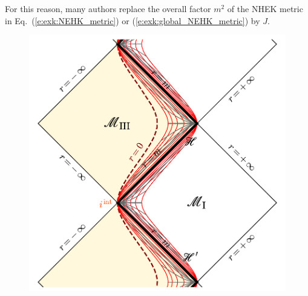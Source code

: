 \begin{remark}
For this reason, many authors replace the overall factor $m^2$ of the NHEK metric
in Eq.~(\ref{e:exk:NEHK_metric}) or (\ref{e:exk:global_NEHK_metric}) by $J$.
\end{remark}


\begin{figure}
\begin{minipage}[c]{0.6\textwidth}
\includegraphics[width=\textwidth]{exk_NH_region.pdf} \\[1ex]
\
\end{minipage}
\hfill
\begin{minipage}[c]{0.35\textwidth}

\end{minipage}
\end{figure}
